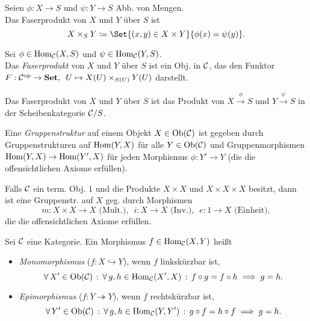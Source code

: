 \documentclass{cheat-sheet}
\begin{document}
\begin{defn}
  Seien $\phi : X \to S$ und $\psi : Y \to S$ Abb. von Mengen. \\
  Das Faserprodukt von $X$ und $Y$ über $S$ ist
  \[ X \times_S Y \coloneqq \Set{ (x, y) \in X \times Y }{ \phi(x) = \psi(y) }. \]
\end{defn}

\begin{defn}
  Sei $\phi \in \operatorname{Hom}_{\mathcal{C}}(X, S)$ und $\psi \in \operatorname{Hom}_{\mathcal{C}}(Y, S)$. \\
  Das \emph{Faserprodukt} von $X$ und $Y$ über $S$ ist ein Obj. in $\mathcal{C}$, das den Funktor
  $F : \mathcal{C}^{\mathrm{op}} \to \mathbf{Set}, \enspace U \mapsto X(U) \times_{S(U)} Y(U)$ darstellt.
\end{defn}

\begin{bem}
  Das Faserprodukt von $X$ und $Y$ über $S$ ist das Produkt von $X \xrightarrow{\phi} S$ und $Y \xrightarrow{\psi} S$ in der Scheibenkategorie $\mathcal{C}/S$.
\end{bem}


\begin{defn}
  Eine \emph{Gruppenstruktur} auf einem Objekt $X \in \operatorname{Ob}(\mathcal{C})$ ist gegeben durch Gruppenstrukturen auf $\operatorname{Hom}(Y, X)$ für alle $Y \in \operatorname{Ob}(\mathcal{C})$ und Gruppenmorphismen $\operatorname{Hom}(Y, X) \to \operatorname{Hom}(Y', X)$ für jeden Morphismus $\phi : Y' \to Y$ (die die offensichtlichen Axiome erfüllen).
\end{defn}

\begin{bem}
  Falls $\mathcal{C}$ ein term. Obj. $1$ und die Produkte $X \!\times\! X$ und $X \!\times\! X \!\times\! X$ besitzt, dann ist eine Gruppenstr. auf $X$ geg. durch Morphismen
  \[
    m : X \times X \to X \text{ (Mult.)}, \enspace
    i : X \to X \text{ (Inv.)}, \enspace
    e : 1 \to X \text{ (Einheit)},
  \]
  die die offensichtlichen Axiome erfüllen.
\end{bem}

\begin{defn}
  Sei $\mathcal{C}$ eine Kategorie. Ein Morphismus $f \in \operatorname{Hom}_{\mathcal{C}}(X, Y)$ heißt
  \begin{itemize}
    \item \emph{Monomorphismus} ($f : X \hookrightarrow Y$), wenn $f$ linkskürzbar ist, \dh{}
    \[
      \forall \, {X' \in \operatorname{Ob}(\mathcal{C})} \,:\, \forall \, {g, h \in \operatorname{Hom}_{\mathcal{C}}(X', X)} \,:\,
      f \circ g = f \circ h \implies g = h.
    \]
    \item \emph{Epimorphismus} ($f : Y \twoheadrightarrow Y$), wenn $f$ rechtskürzbar ist, \dh{}
    \[
      \forall \, {Y' \in \operatorname{Ob}(\mathcal{C})} \,:\, \forall \, {g, h \in \operatorname{Hom}_{\mathcal{C}}(Y, Y')} \,:\,
      g \circ f = h \circ f \implies g = h.
    \]
  \end{itemize}
\end{defn}
\end{document}

